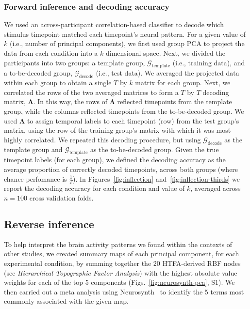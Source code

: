 \documentclass[english, 11pt]{article}
\newcommand{\synthThirds}{S1}
\begin{document}
\subsubsection*{Forward inference and decoding accuracy}

We used an across-participant correlation-based classifier to decode which
stimulus timepoint matched each timepoint's neural pattern. For a given value
of $k$ (i.e., number of principal components), we first used group PCA to
project the data from each condition into a $k$-dimensional space. Next, we
divided the participants into two groups: a template group,
$\mathcal{G}_{\mathrm{template}}$ (i.e., training data), and a to-be-decoded
group, $\mathcal{G}_{\mathrm{decode}}$ (i.e., test data). We averaged the
projected data within each group to obtain a single $T$ by $k$ matrix for each
group. Next, we correlated the rows of the two averaged matrices to form a $T$
by $T$ decoding matrix, $\mathbf{\Lambda}$. In this way, the rows of
$\mathbf{\Lambda}$ reflected timepoints from the template group, while the
columns reflected timepoints from the to-be-decoded group. We used
$\mathbf{\Lambda}$ to assign temporal labels to each timepoint (row) from the
test group's matrix, using the row of the training group's matrix with which it
was most highly correlated. We repeated this decoding procedure, but using
$\mathcal{G}_{\mathrm{decode}}$ as the template group and
$\mathcal{G}_{\mathrm{template}}$ as the to-be-decoded group. Given the true
timepoint labels (for each group), we defined the decoding accuracy as the
average proportion of correctly decoded timepoints, across both groups (where
chance perfomance is $\frac{1}{T}$). In Figures~\ref{fig:inflection}
and~\ref{fig:inflection-thirds} we report the decoding accuracy for each
condition and value of $k$, averaged across $n = 100$ cross validation folds.

\subsection*{Reverse inference}

To help interpret the brain activity patterns we found within the contexts of
other studies, we created summary maps of each principal component, for each
experimental condition, by summing together the 20 HTFA-derived RBF nodes (see
\textit{Hierarchical Topographic Factor Analysis}) with the highest absolute
value weights for each of the top 5 components (Figs.~\ref{fig:neurosynth-pca},
\synthThirds). We then carried out a meta analysis using
Neurosynth~\cite{RubiEtal17} to identify the 5 terms most commonly associated
with the given map.
\end{document}
